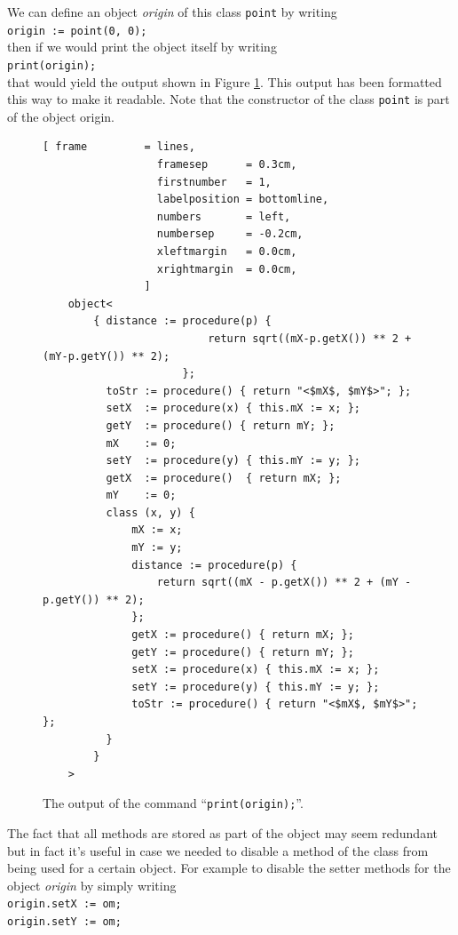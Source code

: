 \documentclass[11pt]{report}
\begin{document}
We can define an object \textsl{origin} of this class
\texttt{point} by writing
\\[0.2cm]
\hspace*{1.3cm}
\texttt{origin := point(0, 0);}
\\[0.2cm]
then if we would print the object itself by writing 
\\[0.2cm]
\hspace*{1.3cm}
\texttt{print(origin);}
\\[0.2cm]
that would yield the output shown in Figure \ref{fig:print_origin}. This output has been formatted this way to make it readable. Note that the constructor of the class \texttt{point} is part of the object origin.

\begin{figure}[!ht]
\centering
\begin{Verbatim}[ frame         = lines, 
                  framesep      = 0.3cm, 
                  firstnumber   = 1,
                  labelposition = bottomline,
                  numbers       = left,
                  numbersep     = -0.2cm,
                  xleftmargin   = 0.0cm,
                  xrightmargin  = 0.0cm,
                ]
    object<
        { distance := procedure(p) { 
                          return sqrt((mX-p.getX()) ** 2 + (mY-p.getY()) ** 2); 
                      }; 
          toStr := procedure() { return "<$mX$, $mY$>"; }; 
          setX  := procedure(x) { this.mX := x; }; 
          getY  := procedure() { return mY; }; 
          mX    := 0; 
          setY  := procedure(y) { this.mY := y; }; 
          getX  := procedure()  { return mX; }; 
          mY    := 0; 
          class (x, y) { 
              mX := x; 
              mY := y; 
              distance := procedure(p) { 
                  return sqrt((mX - p.getX()) ** 2 + (mY - p.getY()) ** 2); 
              }; 
              getX := procedure() { return mX; };
              getY := procedure() { return mY; }; 
              setX := procedure(x) { this.mX := x; }; 
              setY := procedure(y) { this.mY := y; }; 
              toStr := procedure() { return "<$mX$, $mY$>"; }; 
          } 
        }
    >
\end{Verbatim}
\vspace*{-0.3cm}
\caption{The output of the command ``\texttt{print(origin);}''.}
\label{fig:print_origin}
\end{figure}

The fact that all methods are stored as part of the object may seem redundant but in fact it's useful in case we needed to disable a method of the class from being used for a certain object. For example to disable the setter methods for the object \textsl{origin} by simply writing
\\[0.2cm]
\hspace*{1.3cm}
\texttt{origin.setX := om;}
\\
\hspace*{1.3cm}
\texttt{origin.setY := om;}
\\[0.2cm]
\end{document}
